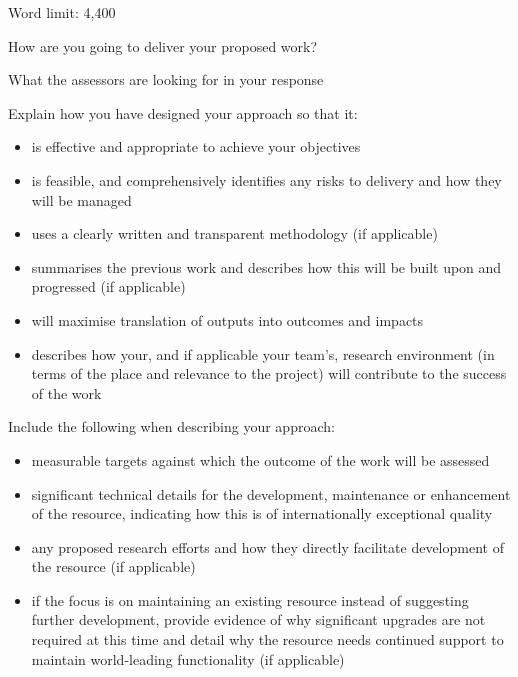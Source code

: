 \documentclass[12in]{article}
\begin{document}
{\color{red}
Word limit: 4,400

How are you going to deliver your proposed work?

What the assessors are looking for in your response

Explain how you have designed your approach so that it:

\begin{itemize}
	\item is effective and appropriate to achieve your objectives

	\item is feasible, and comprehensively identifies any risks to delivery and how they
will be managed

	\item uses a clearly written and transparent methodology (if applicable)

	\item summarises the previous work and describes how this will be built upon and
progressed (if applicable)

	\item will maximise translation of outputs into outcomes and impacts

	\item describes how your, and if applicable your team’s, research environment (in
terms of the place and relevance to the project) will contribute to the success
of the work

\end{itemize}

Include the following when describing your approach:

\begin{itemize}

	\item measurable targets against which the outcome of the work will be assessed

	\item significant technical details for the development, maintenance or
enhancement of the resource, indicating how this is of internationally
exceptional quality

	\item any proposed research efforts and how they directly facilitate development of
the resource (if applicable)

	\item if the focus is on maintaining an existing resource instead of suggesting
further development, provide evidence of why significant upgrades are not
required at this time and detail why the resource needs continued support to
maintain world-leading functionality (if applicable)


\end{itemize}}
\end{document}
